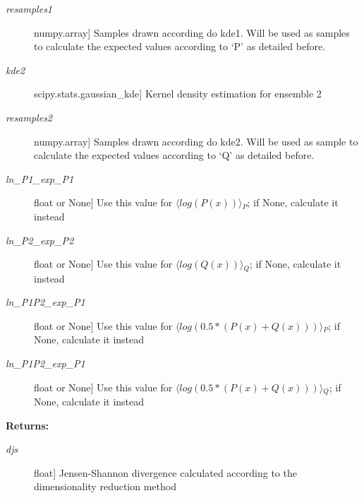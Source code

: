 \documentclass[letterpaper,10pt,english]{sphinxmanual}
\begin{document}
\begin{fulllineitems}
\begin{description}
\item[{\emph{resamples1}}] \leavevmode{[}numpy.array{]}
Samples drawn according do kde1. Will be used as samples to calculate the expected values according to `P' as detailed before.

\item[{\emph{kde2}}] \leavevmode{[}scipy.stats.gaussian\_kde{]}
Kernel density estimation for ensemble 2

\item[{\emph{resamples2}}] \leavevmode{[}numpy.array{]}
Samples drawn according do kde2. Will be used as sample to calculate the expected values according to `Q' as detailed before.

\item[{\emph{ln\_P1\_exp\_P1}}] \leavevmode{[}float or None{]}
Use this value for \(\langle{}log(P(x))\rangle{}_P\); if None, calculate it instead

\item[{\emph{ln\_P2\_exp\_P2}}] \leavevmode{[}float or None{]}
Use this value for \(\langle{}log(Q(x))\rangle{}_Q\); if None, calculate it instead

\item[{\emph{ln\_P1P2\_exp\_P1}}] \leavevmode{[}float or None{]}
Use this value for \(\langle{}log(0.5*(P(x)+Q(x)))\rangle{}_P\);  if None, calculate it instead

\item[{\emph{ln\_P1P2\_exp\_P1}}] \leavevmode{[}float or None{]}
Use this value for \(\langle{}log(0.5*(P(x)+Q(x)))\rangle{}_Q\); if None, calculate it instead

\end{description}

\textbf{Returns:}
\begin{description}
\item[{\emph{djs}}] \leavevmode{[}float{]}
Jensen-Shannon divergence calculated according to the dimensionality reduction method

\end{description}

\end{fulllineitems}

\end{document}
